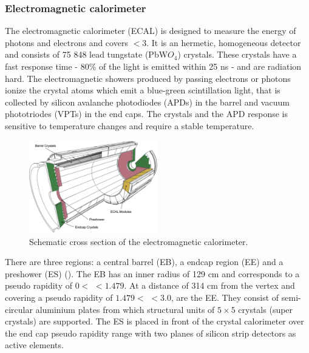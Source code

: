 \subsubsection{Electromagnetic calorimeter}
The electromagnetic calorimeter (ECAL) is designed to measure the energy of photons and electrons and covers \abspsrap $<3$. It is an hermetic, homogeneous detector and consists of 75 848 lead tungstate (PbW$O_4$) crystals. These crystals have a fast response time - 80\% of the light is emitted within 25 \si{ \nano \second} - and are radiation hard. The electromagnetic showers produced by passing electrons or photons ionize the crystal atoms which emit a blue-green scintillation light, that is collected by silicon avalanche photodiodes (APDs) in the barrel and vacuum phototriodes (VPTs) in the end caps. The crystals and the APD response is sensitive to temperature changes and require a stable temperature. 

\begin{figure}[htbp]
	\centering
	\includegraphics[width=0.5\textwidth]{2_ExperimentalSetup/Figures/imageedit_5_8264930617}
	\caption{Schematic cross section of the electromagnetic calorimeter\cite{Chatrchyan:2008aa}.}
	\label{fig:ECAL}
\end{figure}
There are three regions: a central barrel (EB), a endcap region (EE) and a preshower (ES) (). 
The EB has an inner radius of 129 \si{ \centi \meter} and corresponds to a pseudo rapidity of $0 < $ \abspsrap $<1.479$. At a distance of 314 \si{ \centi \meter} from the vertex and covering a pseudo rapidity of $1.479 < $ \abspsrap $<3.0$, are the EE. They consist of semi-circular aluminium plates from which structural units of $5\times5$ crystals (super crystals) are supported. The ES is placed in front of the crystal calorimeter over the end cap pseudo rapidity range with two planes of silicon strip detectors as active elements. 

